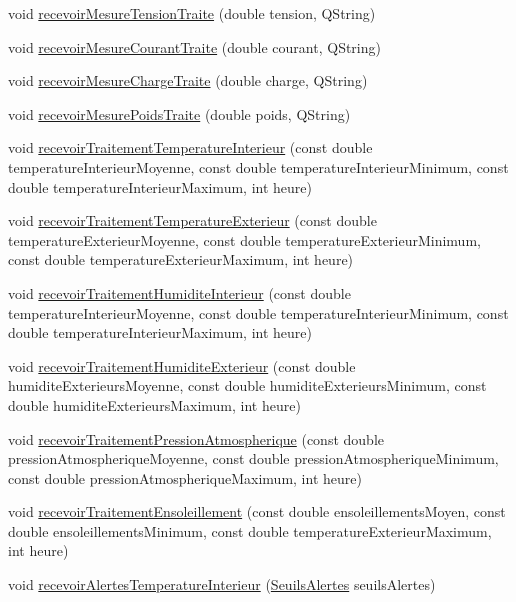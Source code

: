 \begin{DoxyCompactItemize}
\item 
void \hyperlink{class_ruche_a65782ea2ee63003f2eae45e2530e3d5b}{recevoir\+Mesure\+Tension\+Traite} (double tension, Q\+String)
\item 
void \hyperlink{class_ruche_a9e416457e8712d353580b7b242ef0836}{recevoir\+Mesure\+Courant\+Traite} (double courant, Q\+String)
\item 
void \hyperlink{class_ruche_a4ad540139115b79cd52336ad1a11453c}{recevoir\+Mesure\+Charge\+Traite} (double charge, Q\+String)
\item 
void \hyperlink{class_ruche_afd8b0d7512f325327704cd3e37091dc2}{recevoir\+Mesure\+Poids\+Traite} (double poids, Q\+String)
\item 
void \hyperlink{class_ruche_a2d2a681916140b977d45423d0d5d7b34}{recevoir\+Traitement\+Temperature\+Interieur} (const double temperature\+Interieur\+Moyenne, const double temperature\+Interieur\+Minimum, const double temperature\+Interieur\+Maximum, int heure)
\item 
void \hyperlink{class_ruche_a8482dda95a8a7888d5a60ea6f7d8729e}{recevoir\+Traitement\+Temperature\+Exterieur} (const double temperature\+Exterieur\+Moyenne, const double temperature\+Exterieur\+Minimum, const double temperature\+Exterieur\+Maximum, int heure)
\item 
void \hyperlink{class_ruche_a6d4c59f2850f803a0ed1946e737b4262}{recevoir\+Traitement\+Humidite\+Interieur} (const double temperature\+Interieur\+Moyenne, const double temperature\+Interieur\+Minimum, const double temperature\+Interieur\+Maximum, int heure)
\item 
void \hyperlink{class_ruche_a59e89246b484d7b63851c0ebd20af6c5}{recevoir\+Traitement\+Humidite\+Exterieur} (const double humidite\+Exterieurs\+Moyenne, const double humidite\+Exterieurs\+Minimum, const double humidite\+Exterieurs\+Maximum, int heure)
\item 
void \hyperlink{class_ruche_aa42daeffa023c83fde40072601e1fa39}{recevoir\+Traitement\+Pression\+Atmospherique} (const double pression\+Atmospherique\+Moyenne, const double pression\+Atmospherique\+Minimum, const double pression\+Atmospherique\+Maximum, int heure)
\item 
void \hyperlink{class_ruche_a2ac5766ce8652084f034c498691488ea}{recevoir\+Traitement\+Ensoleillement} (const double ensoleillements\+Moyen, const double ensoleillements\+Minimum, const double temperature\+Exterieur\+Maximum, int heure)
\item 
void \hyperlink{class_ruche_a2984c1e492d1ceacd3081e39a4f8cc26}{recevoir\+Alertes\+Temperature\+Interieur} (\hyperlink{parametres_8h_aaa6de8207c94675264c90b10b613368d}{Seuils\+Alertes} seuils\+Alertes)

\end{DoxyCompactItemize}
